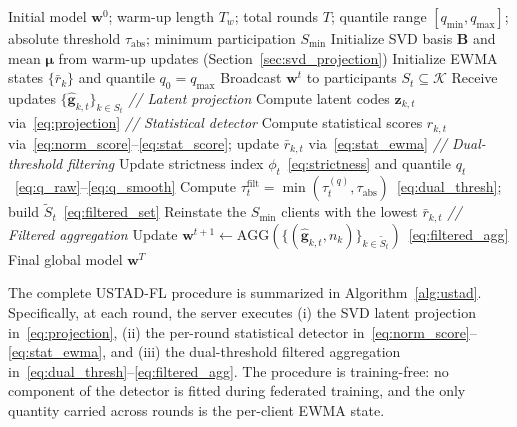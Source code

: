 \documentclass[journal]{IEEEtran}
\begin{document}
\begin{algorithm}[t]
\caption{USTAD-FL: Unsupervised Statistical Anomaly Detection at the server}
\label{alg:ustad}
\begin{algorithmic}[1]
\REQUIRE Initial model $\mathbf{w}^{0}$; warm-up length $T_w$; total rounds $T$; quantile range $[q_{\min},q_{\max}]$; absolute threshold $\tau_{\mathrm{abs}}$; minimum participation $S_{\min}$
\STATE Initialize SVD basis $\mathbf{B}$ and mean $\boldsymbol{\mu}$ from warm-up updates (Section~\ref{sec:svd_projection})
\STATE Initialize EWMA states $\{\bar r_{k}\}$ and quantile $q_{0}\!=\!q_{\max}$
    \STATE Broadcast $\mathbf{w}^{t}$ to participants $S_t \subseteq \mathcal{K}$
    \STATE Receive updates $\{\hat{\mathbf{g}}_{k,t}\}_{k\in S_t}$
    \STATE \textit{// Latent projection}
    \STATE Compute latent codes $\mathbf{z}_{k,t}$ via~\eqref{eq:projection}
    \STATE \textit{// Statistical detector}
    \STATE Compute statistical scores $r_{k,t}$ via~\eqref{eq:norm_score}--\eqref{eq:stat_score}; update $\bar r_{k,t}$ via~\eqref{eq:stat_ewma}
    \STATE \textit{// Dual-threshold filtering}
    \STATE Update strictness index $\phi_t$~\eqref{eq:strictness} and quantile $q_t$~\eqref{eq:q_raw}--\eqref{eq:q_smooth}
    \STATE Compute $\tau_t^{\mathrm{filt}} = \min(\tau_t^{(q)}, \tau_{\mathrm{abs}})$~\eqref{eq:dual_thresh}; build $\widetilde{S}_t$~\eqref{eq:filtered_set}
        \STATE Reinstate the $S_{\min}$ clients with the lowest $\bar r_{k,t}$
    \ENDIF
    \STATE \textit{// Filtered aggregation}
    \STATE Update $\mathbf{w}^{t+1} \!\leftarrow\! \text{AGG}(\{(\hat{\mathbf{g}}_{k,t},n_k)\}_{k\in\widetilde{S}_t})$~\eqref{eq:filtered_agg}
\ENDFOR
\RETURN Final global model $\mathbf{w}^{T}$
\end{algorithmic}
\end{algorithm}

The complete USTAD-FL procedure is summarized in Algorithm~\ref{alg:ustad}. Specifically, at each round, the server executes (i) the SVD latent projection in~\eqref{eq:projection}, (ii) the per-round statistical detector in~\eqref{eq:norm_score}--\eqref{eq:stat_ewma}, and (iii) the dual-threshold filtered aggregation in~\eqref{eq:dual_thresh}--\eqref{eq:filtered_agg}. The procedure is training-free: no component of the detector is fitted during federated training, and the only quantity carried across rounds is the per-client EWMA state.
\end{document}
